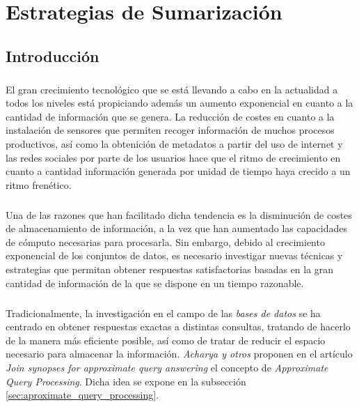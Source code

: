\documentclass{subfiles}
\begin{document}
  \chapter{Estrategias de Sumarización}
  \label{chapter:summaries}

    \section{Introducción}
    \label{sec:summaries_intro}

      \paragraph{}
      El gran crecimiento tecnológico que se está llevando a cabo en la actualidad a todos los niveles está propiciando además un aumento exponencial en cuanto a la cantidad de información que se genera. La reducción de costes en cuanto a la instalación de sensores que permiten recoger información de muchos procesos productivos, así como la obtenición de metadatos a partir del uso de internet y las redes sociales por parte de los usuarios hace que el ritmo de crecimiento en cuanto a cantidad información generada por unidad de tiempo haya crecido a un ritmo frenético.

      \paragraph{}
      Una de las razones que han facilitado dicha tendencia es la disminución de costes de almacenamiento de información, a la vez que han aumentado las capacidades de cómputo necesarias para procesarla. Sin embargo, debido al crecimiento exponencial de los conjuntos de datos, es necesario investigar nuevas técnicas y estrategias que permitan obtener respuestas satisfactorias basadas en la gran cantidad de información de la que se dispone en un tiempo razonable.

      \paragraph{}
      Tradicionalmente, la investigación en el campo de las \emph{bases de datos} se ha centrado en obtener respuestas exactas a distintas consultas, tratando de hacerlo de la manera más eficiente posible, así como de tratar de reducir el espacio necesario para almacenar la información. \emph{Acharya y otros} proponen en el artículo \emph{Join synopses for approximate query answering} \cite{acharya1999join} el concepto de \emph{Approximate Query Processing}. Dicha idea se expone en la subsección \ref{sec:aproximate_query_processing}.
\end{document}
